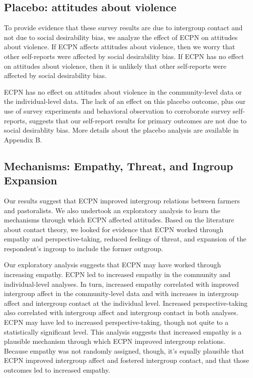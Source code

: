\documentclass[11pt]{article}
\begin{document}
\hypertarget{placebo-attitudes-about-violence}{%
\subsection{Placebo: attitudes about
violence}\label{placebo-attitudes-about-violence}}

To provide evidence that these survey results are due to intergroup
contact and not due to social desirability bias, we analyze the effect
of ECPN on attitudes about violence. If ECPN affects attitudes about
violence, then we worry that other self-reports were affected by social
desirability bias. If ECPN has no effect on attitudes about violence,
then it is unlikely that other self-reports were affected by social
desirability bias.

ECPN has no effect on attitudes about violence in the community-level
data or the individual-level data. The lack of an effect on this placebo
outcome, plus our use of survey experiments and behavioral observation
to corroborate survey self-reports, suggests that our self-report
results for primary outcomes are not due to social desirablity bias.
More details about the placebo analysis are available in Appendix B.

\hypertarget{mechanisms-empathy-threat-and-ingroup-expansion}{%
\subsection{Mechanisms: Empathy, Threat, and Ingroup
Expansion}\label{mechanisms-empathy-threat-and-ingroup-expansion}}

Our results suggest that ECPN improved intergroup relations between
farmers and pastoralists. We also undertook an exploratory analysis to
learn the mechanisms through which ECPN affected attitudes. Based on the
literature about contact theory, we looked for evidence that ECPN worked
through empathy and perspective-taking, reduced feelings of threat, and
expansion of the respondent's ingroup to include the former outgroup.

Our exploratory analysis suggests that ECPN may have worked through
increasing empathy. ECPN led to increased empathy in the community and
individual-level analyses. In turn, increased empathy correlated with
improved intergroup affect in the community-level data and with
increases in intergroup affect and intergroup contact at the individual
level. Increased perspective-taking also correlated with intergroup
affect and intergroup contact in both analyses. ECPN may have led to
increased perspective-taking, though not quite to a statistically
significant level. This analysis suggests that increased empathy is a
plausible mechanism through which ECPN improved intergroup relations.
Because empathy was not randomly assigned, though, it's equally
plausible that ECPN improved intergroup affect and fostered intergroup
contact, and that those outcomes led to increased empathy.
\end{document}
